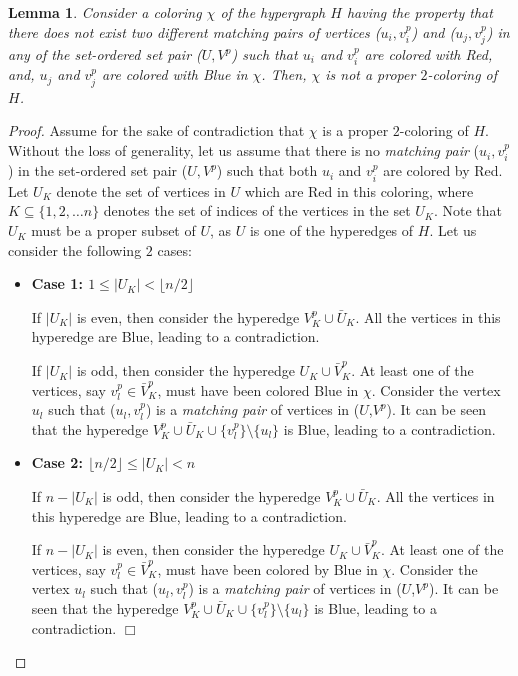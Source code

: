 \documentclass[11pt]{article}
\newtheorem{lemma}{Lemma}
\def\qed{$\Box$}
\begin{document}
\begin{lemma}
\label{firstlemma}
Consider a coloring $\chi$ of the hypergraph $H$ having the property that there does not exist two different \textit{matching pairs} of vertices ($u_i,v_i^p$) and ($u_j,v_j^p$) in any of the set-ordered set pair ($U,V^p$) such that $u_i$ and $v_i^p$ are colored with Red, and, $u_j$ and $v_j^p$ are colored with Blue in $\chi$. Then, $\chi$ is not a proper $2$-coloring of $H$.
\end{lemma}
\begin{proof}
Assume for the sake of contradiction that $\chi$ is a proper $2$-coloring of $H$.
Without the loss of generality, let us assume that there is no \textit{matching pair} ($u_i,v_i^p$) in the set-ordered set pair ($U,V^p$) such that both $u_i$ and $v_i^p$ are colored by Red. Let $U_K$ denote the set of vertices in $U$ which are Red in this coloring, where $K \subseteq  \{1, 2, \ldots n\}$ denotes the set of indices of the vertices in the set $U_K$. Note that $U_K$ must be a proper subset of $U$, as $U$ is one of the hyperedges of $H$. Let us consider the following $2$ cases:

\begin{itemize}
\item \textbf{Case 1: $1 \leq |U_K| < \lfloor n/2\rfloor$}

If $|U_K|$ is even, then consider the hyperedge $V_K^p \cup {\bar{U}}_K$. All the vertices in this hyperedge are Blue, leading to a contradiction.

If $|U_K|$ is odd, then consider the hyperedge $U_K \cup {\bar{V}}_K^p$. At least one of the vertices, say 
$v_l^p \in {\bar{V}}_K^p$, must have been colored Blue in $\chi$. Consider the vertex $u_l$ such that ($u_l,v_l^p$) is a \textit{matching pair} of vertices in ($U$,$V^p$). It can be seen that the hyperedge $V_K^p \cup {\bar{U}}_K \cup \{v_l^p\} \setminus \{u_l\}$ is Blue, leading to a contradiction.

\item \textbf{Case 2: $\lfloor n/2\rfloor \leq |U_K| < n$}

If $n - |U_K|$ is odd, then consider the hyperedge $V_K^p \cup {\bar{U}}_K$. All the vertices in this hyperedge are Blue, leading to a contradiction.

If $n - |U_K|$ is even, then consider the hyperedge $U_K \cup {\bar{V}}_K^p$. At least one of the vertices, say $v_l^p \in {\bar{V}}_K^p$, must have been colored by Blue in $\chi$. Consider the vertex $u_l$ such that ($u_l,v_l^p$) is a \textit{matching pair} of vertices in ($U$,$V^p$). It can be seen that the hyperedge 
$V_K^p \cup {\bar{U}}_K \cup \{v_l^p\} \setminus \{u_l\}$ is Blue, leading to a contradiction. \qed
\end{itemize}
\end{proof}
\end{document}
